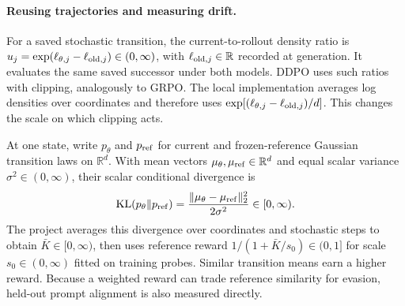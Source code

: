 \paragraph{Reusing trajectories and measuring drift.}
For a saved stochastic transition, the current-to-rollout density ratio is
$u_j=\exp(\ell_{\theta,j}-\ell_{{\rm old},j})\in(0,\infty)$, with $\ell_{{\rm old},j}\in\mathbb R$ recorded at generation. It evaluates the same saved successor under both models. DDPO uses such ratios with clipping, analogously to GRPO. The local implementation averages log densities over coordinates and therefore uses $\exp[(\ell_{\theta,j}-\ell_{{\rm old},j})/d]$. This changes the scale on which clipping acts.

At one state, write $p_\theta$ and $p_{\rm ref}$ for current and frozen-reference Gaussian transition laws on $\mathbb R^d$. With mean vectors $\mu_\theta,\mu_{\rm ref}\in\mathbb R^d$ and equal scalar variance $\sigma^2\in(0,\infty)$, their scalar conditional divergence is
\begin{equation}
\label{eq:gaussian-transition-kl}
 \operatorname{KL}(p_\theta\Vert p_{\rm ref})
 =\frac{\|\mu_\theta-\mu_{\rm ref}\|_2^2}{2\sigma^2}\in[0,\infty).
\end{equation}
The project averages this divergence over coordinates and stochastic steps to obtain $\bar K\in[0,\infty)$, then uses reference reward $1/(1+\bar K/s_0)\in(0,1]$ for scale $s_0\in(0,\infty)$ fitted on training probes. Similar transition means earn a higher reward. Because a weighted reward can trade reference similarity for evasion, held-out prompt alignment is also measured directly.
